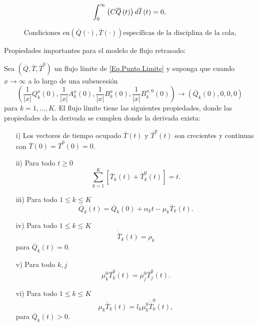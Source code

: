 \begin{Teo}
\begin{equation}\label{Eq.MF.5.3a}
\int_{0}^{\infty}\left(C\overline{Q}\left(t\right)\right)d\overline{I}\left(t\right)=0,\\
\end{equation}

\begin{equation}\label{Eq.MF.6.3a}
\textrm{Condiciones en
}\left(\overline{Q}\left(\cdot\right),\overline{T}\left(\cdot\right)\right)\textrm{
espec\'ificas de la disciplina de la cola,}
\end{equation}
\end{Teo}


Propiedades importantes para el modelo de flujo retrasado:

\begin{Prop}
 Sea $\left(\overline{Q},\overline{T},\overline{T}^{0}\right)$ un flujo l\'imite de \ref{Eq.Punto.Limite}
 y suponga que cuando $x\rightarrow\infty$ a lo largo de una subsucesi\'on
\[\left(\frac{1}{|x|}Q_{k}^{x}\left(0\right),\frac{1}{|x|}A_{k}^{x}\left(0\right),\frac{1}{|x|}B_{k}^{x}\left(0\right),\frac{1}{|x|}B_{k}^{x,0}\left(0\right)\right)\rightarrow\left(\overline{Q}_{k}\left(0\right),0,0,0\right)\]
para $k=1,\ldots,K$. El flujo l\'imite tiene las siguientes
propiedades, donde las propiedades de la derivada se cumplen donde
la derivada exista:
\begin{itemize}
 \item[i)] Los vectores de tiempo ocupado $\overline{T}\left(t\right)$ y $\overline{T}^{0}\left(t\right)$ son crecientes y continuas con
$\overline{T}\left(0\right)=\overline{T}^{0}\left(0\right)=0$.
\item[ii)] Para todo $t\geq0$
\[\sum_{k=1}^{K}\left[\overline{T}_{k}\left(t\right)+\overline{T}_{k}^{0}\left(t\right)\right]=t.\]
\item[iii)] Para todo $1\leq k\leq K$
\[\overline{Q}_{k}\left(t\right)=\overline{Q}_{k}\left(0\right)+\alpha_{k}t-\mu_{k}\overline{T}_{k}\left(t\right).\]
\item[iv)]  Para todo $1\leq k\leq K$
\[\dot{{\overline{T}}}_{k}\left(t\right)=\rho_{k}\] para $\overline{Q}_{k}\left(t\right)=0$.
\item[v)] Para todo $k,j$
\[\mu_{k}^{0}\overline{T}_{k}^{0}\left(t\right)=\mu_{j}^{0}\overline{T}_{j}^{0}\left(t\right).\]
\item[vi)]  Para todo $1\leq k\leq K$
\[\mu_{k}\dot{{\overline{T}}}_{k}\left(t\right)=l_{k}\mu_{k}^{0}\dot{{\overline{T}}}_{k}^{0}\left(t\right),\] para $\overline{Q}_{k}\left(t\right)>0$.
\end{itemize}
\end{Prop}

